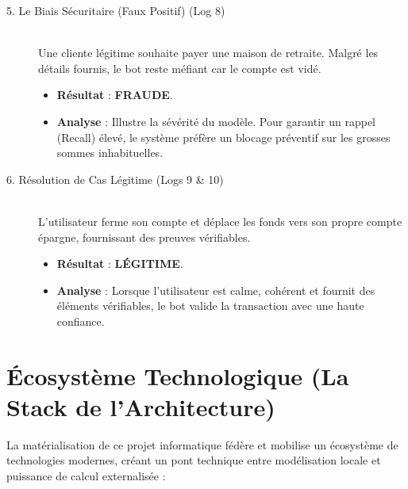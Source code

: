 \documentclass[12pt, a4paper, twoside]{report}
\begin{document}
\begin{description}
    \item[5. Le Biais Sécuritaire (Faux Positif) (Log 8)] \hfill \\
    Une cliente légitime souhaite payer une maison de retraite. Malgré les détails fournis, le bot reste méfiant car le compte est vidé.
    \begin{itemize}
        \item \textbf{Résultat} : \textbf{FRAUDE}.
        \item \textbf{Analyse} : Illustre la sévérité du modèle. Pour garantir un rappel (Recall) élevé, le système préfère un blocage préventif sur les grosses sommes inhabituelles.
    \end{itemize}

    \item[6. Résolution de Cas Légitime (Logs 9 \& 10)] \hfill \\
    L'utilisateur ferme son compte et déplace les fonds vers son propre compte épargne, fournissant des preuves vérifiables.
    \begin{itemize}
        \item \textbf{Résultat} : \textbf{LÉGITIME}.
        \item \textbf{Analyse} : Lorsque l'utilisateur est calme, cohérent et fournit des éléments vérifiables, le bot valide la transaction avec une haute confiance.
    \end{itemize}
\end{description}

\section{Écosystème Technologique (La Stack de l'Architecture)}

La matérialisation de ce projet informatique fédère et mobilise un écosystème de technologies modernes, créant un pont technique entre modélisation locale et puissance de calcul externalisée :
\end{document}
